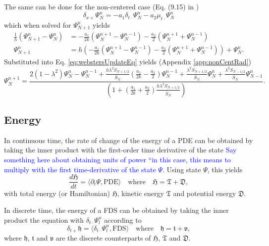 \documentclass[dvipsnames]{article}
\def\SWcomment[#1]{\textcolor{blue}{#1}}
\def\Psiln{\Psi_l^n}
\def\dtd{\delta_{t\cdot}}
\begin{document}
The same can be done for the non-centered case (Eq. (9.15) in \cite{Bilbao2009})
\begin{equation}\label{eq:nonCentRadBound}
    \delta_{x+}\Psi_N^n = -a_1\dtd\Psi_N^n - a_2\mu_{t\cdot}\Psi_N^n
\end{equation}
which when solved for $\Psi_{N+1}^n$ yields
\begin{align}
    \frac{1}{h}(\Psi_{N+1}^n - \Psi_{N}^n) &= -\frac{a_1}{2k}(\Psi_N^{n+1} - \Psi_N^{n-1}) - \frac{a_2}{2}(\Psi_N^{n+1} + \Psi_N^{n-1})\nonumber\\
        \Psi_{N+1}^n &= h\left(-\frac{a_1}{2k}(\Psi_N^{n+1} - \Psi_N^{n-1}) - \frac{a_2}{2}(\Psi_N^{n+1} + \Psi_N^{n-1})\right) + \Psi_{N}^n.
\end{align}
Substituted into Eq. \eqref{eq:webstersUpdateEq} yields (Appendix \ref{app:nonCentRad})
\begin{equation}
    \Psi_N^{n+1} = \frac{2(1-\lambda^2)\Psi_N^n-\Psi_N^{n-1}+\frac{h\lambda^2S_{N+1/2}}{\bar S_N}\left(\frac{a_1}{2k}-\frac{a_2}{2}\right)\Psi_N^{n-1} + \frac{\lambda^2S_{N+1/2}}{\bar S_N}\Psi_{N}^n + \frac{\lambda^2S_{N-1/2}}{\bar S_N}\Psi_{N-1}^n}{\left(1+\left(\frac{a_1}{2k}+\frac{a_2}{2}\right)\frac{h\lambda^2S_{N+1/2}}{\bar S_N}\right)}.
\end{equation}

\subsection{Energy}
In continuous time, the rate of change of the energy of a PDE can be obtained by taking the inner product with the first-order time derivative of the state \SWcomment[Say something here about obtaining units of power ``in this case, this means to multiply with the first time-derivative of the state $\Psi$]. Using state $\Psi$, this yields
\begin{equation}
    \frac{d\mathfrak{H}}{dt} = \langle \partial_t\Psi, \text{PDE} \rangle\quad \text{where} \quad \mathfrak{H} = \mathfrak{T} + \mathfrak{D},
\end{equation}
with total energy (or Hamiltonian) $\mathfrak{H}$, kinetic energy $\mathfrak{T}$ and potential energy $\mathfrak{D}$.

In discrete time, the energy of a FDS can be obtained by taking the inner product the equation with $\dtd\Psiln$ according to 
\begin{equation}\label{eq:energyForm}
    \delta_{t+}\mathfrak{h} = \langle \dtd\Psiln,\text{FDS}\rangle \quad \text{where} \quad \mathfrak{h} = \mathfrak{t} + \mathfrak{v},
\end{equation}
where $\mathfrak{h}$, $\mathfrak{t}$ and $\mathfrak{v}$ are the discrete counterparts of $\mathfrak{H}$, $\mathfrak{T}$ and $\mathfrak{D}$.
\end{document}
